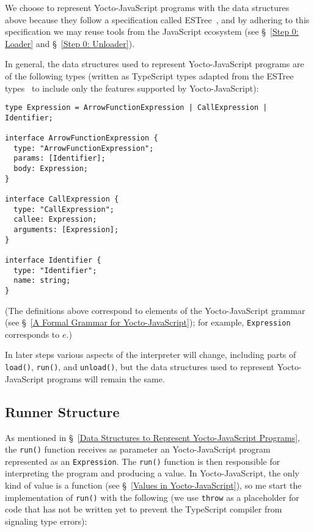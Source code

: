 \documentclass[12pt, oneside]{book}
\begin{document}
We choose to represent Yocto-JavaScript programs with the data structures above because they follow a specification called ESTree~\cite{estree}, and by adhering to this specification we may reuse tools from the JavaScript ecosystem (see §~\ref{Step 0: Loader} and §~\ref{Step 0: Unloader}).

In general, the data structures used to represent Yocto-JavaScript programs are of the following types (written as TypeScript types adapted from the ESTree types~\cite{estree-types} to include only the features supported by Yocto-JavaScript):

\begin{verbatim}
type Expression = ArrowFunctionExpression | CallExpression | Identifier;

interface ArrowFunctionExpression {
  type: "ArrowFunctionExpression";
  params: [Identifier];
  body: Expression;
}

interface CallExpression {
  type: "CallExpression";
  callee: Expression;
  arguments: [Expression];
}

interface Identifier {
  type: "Identifier";
  name: string;
}
\end{verbatim}

(The definitions above correspond to elements of the Yocto-JavaScript grammar (see §~\ref{A Formal Grammar for Yocto-JavaScript}); for example, \texttt{Expression} corresponds to $e$.)

In later steps various aspects of the interpreter will change, including parts of \texttt{load()}, \texttt{run()}, and \texttt{unload()}, but the data structures used to represent Yocto-JavaScript programs will remain the same.

\subsection{Runner Structure}
\label{Runner Structure}

As mentioned in §~\ref{Data Structures to Represent Yocto-JavaScript Programs}, the \texttt{run()} function receives as parameter an Yocto-JavaScript program represented as an \texttt{Expression}. The \texttt{run()} function is then responsible for interpreting the program and producing a value. In Yocto-JavaScript, the only kind of value is a function (see §~\ref{Values in Yocto-JavaScript}), so me start the implementation of \texttt{run()} with the following (we use \texttt{throw} as a placeholder for code that has not be written yet to prevent the TypeScript compiler from signaling type errors):
\end{document}
